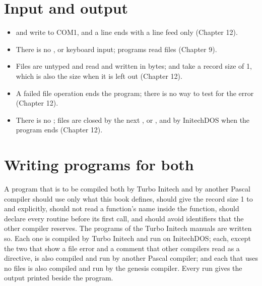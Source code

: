 \section{Input and output}
\begin{itemize}
\item {} and  write to COM1, and a line
  ends with a line feed only (Chapter 12).
\item There is no ,  or keyboard input; programs read
  files (Chapter 9).
\item Files are untyped and read and written in bytes;
   and  take a record size of 1, which
  is also the size when it is left out (Chapter 12).
\item A failed file operation ends the program; there is no way to test for
  the error (Chapter 12).
\item There is no ; files are closed by the next
  ,  or , and by
  InitechDOS when the program ends (Chapter 12).
\end{itemize}

\section{Writing programs for both}
A program that is to be compiled both by Turbo Initech and by another
Pascal compiler should use only what this book defines, should give the
record size 1 to  and  explicitly,
should not read a function's name inside the function, should declare
every routine before its first call, and should avoid identifiers that the
other compiler reserves.  The programs of the Turbo Initech manuals are
written so.  Each one is compiled by Turbo Initech and run on InitechDOS;
each, except the two that show a file error and a comment that other
compilers read as a directive, is also compiled and run by another Pascal
compiler; and each that uses no files is also compiled and run by the
genesis compiler.  Every run gives the output printed beside the program.
